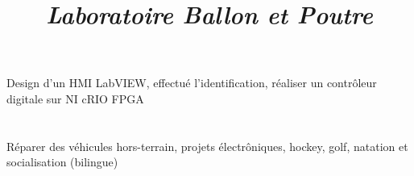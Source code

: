 \documentclass[mm]{res}
\begin{document}
\begin{resume}
\title{\textsl{Laboratoire Ballon et Poutre}}
\begin{position}
\tb Design d'un HMI LabVIEW, effectu\'e l'identification, r\'ealiser un contr\^oleur digitale sur NI cRIO FPGA
\end{position}





\toprule

\section{\headinginterests}
\tb R\'eparer des v\'ehicules hors-terrain, projets \'electr\^oniques, hockey, golf, natation et socialisation (bilingue)

\end{resume}
\end{document}
